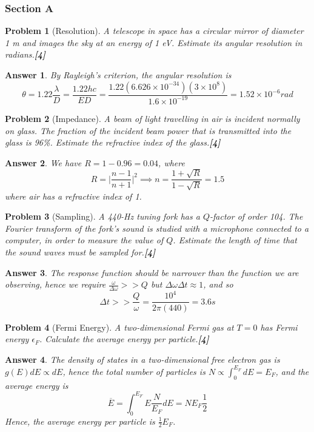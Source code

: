 \documentclass[a4paper]{article}
\newtheorem{ans}{Answer}[subsection]
\theoremstyle{new}
\newtheorem{qns}{Problem}[subsection]
\begin{document}
\subsubsection{Section A}
\begin{qns}[Resolution]
A telescope in space has a circular mirror of diameter 1 m and images the sky at an energy of 1 eV. Estimate its angular resolution in radians.\hfill\textbf{[4]}
\end{qns}
\begin{ans}
By Rayleigh's criterion, the angular resolution is
$$\theta=1.22\frac{\lambda}{D}=\frac{1.22hc}{ED}=\frac{1.22(6.626\times10^{-34})(3\times10^8)}{1.6\times10^{-19}}=1.52\times10^{-6}rad$$
\end{ans}
\begin{qns}[Impedance]
A beam of light travelling in air is incident normally on glass. The fraction of the incident beam power that is transmitted into the glass is 96\%. Estimate the refractive index of the glass.\hfill\textbf{[4]}
\end{qns}
\begin{ans}
We have $R=1-0.96=0.04$, where
$$R=\bigg|\frac{n-1}{n+1}\bigg|^2\implies n=\frac{1+\sqrt{R}}{1-\sqrt{R}}=1.5$$
where air has a refractive index of 1.
\end{ans}
\begin{qns}[Sampling]
A 440-Hz tuning fork has a $Q$-factor of order 104. The Fourier transform of the fork’s sound is studied with a microphone connected to a computer, in order to measure the value of $Q$. Estimate the length of time that the sound waves must be sampled for.\hfill\textbf{[4]}
\end{qns}
\begin{ans}
The response function should be narrower than the function we are observing, hence we require $\frac{\omega}{\Delta\omega}>>Q$ but $\Delta\omega\Delta t\approx 1$, and so
$$\Delta t>>\frac{Q}{\omega}=\frac{10^4}{2\pi(440)}=3.6s$$
\end{ans}
\begin{qns}[Fermi Energy]
A two-dimensional Fermi gas at $T = 0$ has Fermi energy $\epsilon_F$. Calculate the average energy per particle.\hfill\textbf{[4]}
\end{qns}
\begin{ans}
The density of states in a two-dimensional free electron gas is $g(E)dE\propto dE$, hence the total number of particles is $N\propto \int_0^{E_F}dE=E_F$, and the average energy is
$$\overline{E}=\int_0^{E_F}E\frac{N}{E_F}dE=NE_F\frac{1}{2}$$
Hence, the average energy per particle is $\frac{1}{2}E_F$.
\end{ans}
\end{document}

